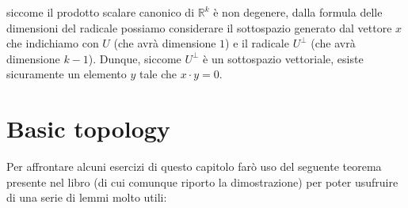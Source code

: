 \documentclass{report}
\begin{document}
\begin{mysolution}
siccome il prodotto scalare canonico di $\mathbb{R}^k$ è non degenere, dalla formula delle dimensioni del radicale possiamo considerare il sottospazio generato dal vettore $x$ che indichiamo con $U$ (che avrà dimensione $1$) e il radicale $U^{\perp}$ (che avrà dimensione $k-1$). Dunque, siccome $U^{\perp}$ è un sottospazio vettoriale, esiste sicuramente un elemento $y$ tale che $x \cdot y = 0$.
\end{mysolution}

\chapter{Basic topology}
Per affrontare alcuni esercizi di questo capitolo farò uso del seguente teorema presente nel libro (di cui comunque riporto la dimostrazione) per poter usufruire di una serie di lemmi molto utili:
\end{document}
